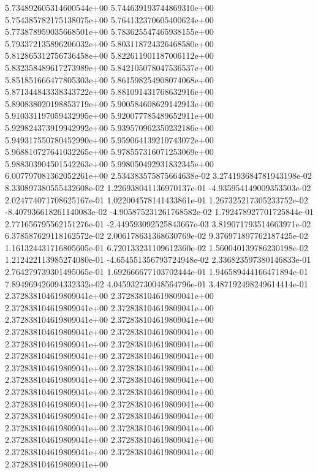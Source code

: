 5.734892605314600544e+00	5.744639193744869310e+00	5.754385782175138075e+00	5.764132370605400624e+00	5.773878959035668501e+00	5.783625547465938155e+00	5.793372135896206032e+00	5.803118724326468580e+00	5.812865312756736458e+00	5.822611901187006112e+00	5.832358489617273989e+00	5.842105078047536537e+00	5.851851666477805303e+00	5.861598254908074068e+00	5.871344843338343722e+00	5.881091431768632916e+00	5.890838020198853719e+00	5.900584608629142913e+00	5.910331197059432995e+00	5.920077785489652911e+00	5.929824373919942992e+00	5.939570962350232186e+00	5.949317550780452990e+00	5.959064139210743072e+00	5.968810727641032265e+00	5.978557316071253069e+00	5.988303904501542263e+00	5.998050492931832345e+00	6.007797081362052261e+00
2.534383575875664638e-02	3.274193684781943198e-02	8.330897380555432608e-02	1.226938041136970137e-01	-4.935954149009353503e-02	2.024774071708625167e-01	1.022004578141433861e-01	1.267325217305233752e-02	-8.407936618261140083e-02	-4.905875231261768582e-02	1.792478927701725844e-01	2.771656795562151276e-01	-2.449593092525843667e-03	3.819071793514663971e-02	6.378587629118162572e-02	2.006178631368630769e-02	9.376971897762187425e-02	1.161324431716805605e-01	6.720133231109612360e-02	1.560040139786230198e-02	1.212422113985274080e-01	-4.654551356793724948e-02	2.336823597380146833e-01	2.764279739301495065e-01	1.692666677103702444e-01	1.946589444166471894e-01	7.894969426094332332e-02	4.045932730048564796e-01	3.487192498249614414e-01
2.372838104619809041e+00	2.372838104619809041e+00	2.372838104619809041e+00	2.372838104619809041e+00	2.372838104619809041e+00	2.372838104619809041e+00	2.372838104619809041e+00	2.372838104619809041e+00	2.372838104619809041e+00	2.372838104619809041e+00	2.372838104619809041e+00	2.372838104619809041e+00	2.372838104619809041e+00	2.372838104619809041e+00	2.372838104619809041e+00	2.372838104619809041e+00	2.372838104619809041e+00	2.372838104619809041e+00	2.372838104619809041e+00	2.372838104619809041e+00	2.372838104619809041e+00	2.372838104619809041e+00	2.372838104619809041e+00	2.372838104619809041e+00	2.372838104619809041e+00	2.372838104619809041e+00	2.372838104619809041e+00	2.372838104619809041e+00	2.372838104619809041e+00
